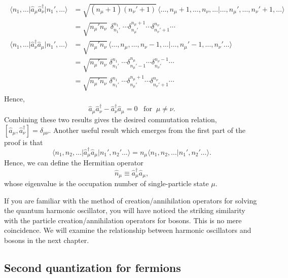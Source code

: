 \documentclass[pra,12pt]{revtex4}
\begin{document}
\begin{align*}
  \begin{aligned}\big\langle n_1, \dots \big| \hat{a}_\mu \hat{a}_\nu^\dagger \big| n_1', \dots\big\rangle &= \sqrt{(n_\mu+1)(n_\nu'+1)}\, \langle \dots, n_\mu+1, \dots, n_\nu, \dots | \dots, n_\mu', \dots, n_\nu'+1, \dots\rangle \\ &= \sqrt{n_\mu' n_\nu} \;\, \delta^{n_1}_{n_1'} \; \cdots \delta^{n_\mu+1}_{n_\mu'} \cdots \delta^{n_\nu}_{n_\nu' + 1}\cdots \\ \big\langle n_1, \dots \big| \hat{a}_\nu^\dagger \hat{a}_\mu \big| n_1', \dots\big\rangle &= \sqrt{n_\mu' n_\nu}\, \langle \dots, n_\mu, \dots,n_\nu-1,\dots | \dots, n_\mu'-1, \dots, n_\nu'\dots\rangle \\&= \sqrt{n_\mu' n_\nu} \;\delta^{n_1}_{n_1'} \; \cdots \delta^{n_\mu}_{n_\mu'-1}\cdots \delta^{n_\nu-1}_{n_\nu'} \cdots \\ &= \sqrt{n_\mu' n_\nu} \; \delta^{n_1}_{n_1'} \; \cdots \delta^{n_\mu+1}_{n_\mu'}\cdots \delta^{n_\nu}_{n_\nu'+1} \cdots\end{aligned}
\end{align*}
Hence,
\begin{equation}
  \hat{a}_\mu \hat{a}_\nu^\dagger - \hat{a}_\nu^\dagger \hat{a}_\mu = 0 \;\;\;\mathrm{for}\;\;\mu\ne\nu.
\end{equation}
Combining these two results gives the desired commutation relation,
$[\hat{a}_\mu, \hat{a}_\nu^\dagger] = \delta_{\mu\nu}$.  Another useful result which
emerges from the first part of the proof is that
\begin{equation}
  \big\langle n_1, n_2, \dots \big| \hat{a}_\mu^\dagger \hat{a}_\mu \big| n_1', n_2'\dots\big\rangle = n_\mu \big\langle n_1, n_2, \dots \big| n_1', n_2'\dots\big\rangle.
\end{equation}
Hence, we can define the Hermitian operator
\begin{equation}
  \hat{n}_\mu \equiv \hat{a}_\mu^\dagger \hat{a}_\mu,
\end{equation}
whose eigenvalue is the occupation number of single-particle state $\mu$.

If you are familiar with the method of creation/annihilation operators
for solving the quantum harmonic oscillator, you will have noticed the
striking similarity with the particle creation/annihilation operators
for bosons.  This is no mere coincidence.  We will examine the
relationship between harmonic oscillators and bosons in the next
chapter.

\subsection{Second quantization for fermions}
\label{sec:second_quantized_fermions}
\end{document}
